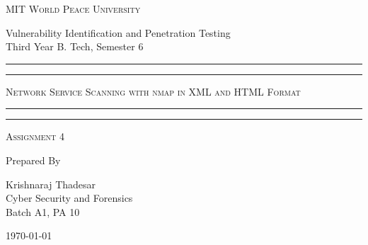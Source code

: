 \documentclass[11pt]{article}
\begin{document}
\begin{titlepage}
    \centering


    \huge\textsc{
        MIT World Peace University
    }\\

    \vspace{0.75\baselineskip} %

    \LARGE{
        Vulnerability Identification and Penetration Testing\\
        Third Year B. Tech, Semester 6
    }

    \vfill %


    \rule{\textwidth}{1.6pt}\vspace*{-\baselineskip}\vspace*{2pt}
    \rule{\textwidth}{0.6pt}
    \vspace{0.75\baselineskip} %



    \huge{\textsc{
            Network Service Scanning with nmap in XML and HTML Format
        }} \\



    \vspace{0.5\baselineskip} %
    \rule{\textwidth}{0.6pt}\vspace*{-\baselineskip}\vspace*{2.8pt}
    \rule{\textwidth}{1.6pt}

    \vspace{1\baselineskip} %


    \LARGE\textsc{
        Assignment 4
    } %
    \vfill


    Prepared By
    \vspace{0.5\baselineskip} %

    \Large{
        Krishnaraj Thadesar \\
        Cyber Security and Forensics\\
        Batch A1, PA 10
    }


    \vspace{0.5\baselineskip} %
    \today

\end{titlepage}
\end{document}
